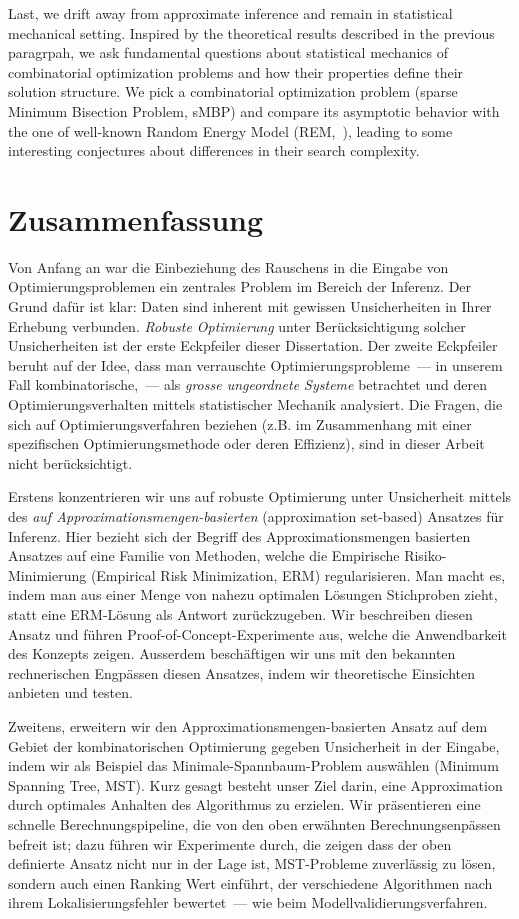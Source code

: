 Last, we drift away from approximate inference and remain in statistical
mechanical setting. Inspired by the theoretical results described in the
previous paragrpah, we ask fundamental questions about statistical mechanics of
combinatorial optimization problems and how their properties define their
solution structure. We pick a combinatorial optimization problem (sparse Minimum
Bisection Problem, sMBP) and compare its asymptotic behavior with the one of
well-known Random Energy Model (REM,~\citealp{derrida81}), leading to some
interesting conjectures about differences in their search complexity.

\chapter*{Zusammenfassung}

Von Anfang an war die Einbeziehung des Rauschens in die Eingabe von
Optimierungsproblemen ein zentrales Problem im Bereich der Inferenz. Der Grund
dafür ist klar: Daten sind inherent mit gewissen Unsicherheiten in Ihrer
Erhebung verbunden. \textit{Robuste Optimierung} unter Berücksichtigung solcher Unsicherheiten
ist der erste Eckpfeiler dieser Dissertation. Der zweite Eckpfeiler beruht auf
der Idee, dass man verrauschte Optimierungsprobleme~--- in unserem Fall
kombinatorische,~--- als \textit{grosse ungeordnete Systeme} betrachtet und
deren Optimierungsverhalten mittels statistischer Mechanik analysiert. Die
Fragen, die sich auf Optimierungsverfahren beziehen (z.B. im Zusammenhang mit
einer spezifischen Optimierungsmethode oder deren Effizienz), sind in dieser Arbeit
nicht berücksichtigt.


Erstens konzentrieren wir uns auf robuste Optimierung unter Unsicherheit mittels
des \textit{auf Approximationsmengen-basierten} (approximation set-based)
Ansatzes für Inferenz. Hier bezieht sich der Begriff des Approximationsmengen
basierten Ansatzes auf eine Familie von Methoden, welche die Empirische
Risiko-Minimierung (Empirical Risk Minimization, ERM) regularisieren. Man macht
es, indem man aus einer Menge von nahezu optimalen Lösungen Stichproben zieht,
statt eine ERM-Lösung als Antwort zurückzugeben. Wir beschreiben diesen Ansatz
und führen Proof-of-Concept-Experimente aus, welche die Anwendbarkeit des
Konzepts zeigen. Ausserdem beschäftigen wir uns mit den bekannten rechnerischen
Engpässen diesen Ansatzes, indem wir theoretische Einsichten anbieten und
testen.

Zweitens, erweitern wir den Approximationsmengen-basierten Ansatz auf dem Gebiet
der kombinatorischen Optimierung gegeben Unsicherheit in der Eingabe, indem wir
als Beispiel das Minimale-Spannbaum-Problem auswählen (Minimum Spanning Tree,
MST). Kurz gesagt besteht unser Ziel darin, eine Approximation durch optimales
Anhalten des Algorithmus zu erzielen. Wir präsentieren eine schnelle
Berechnungspipeline, die von den oben erwähnten Berechnungsenpässen befreit ist;
dazu führen wir Experimente durch, die zeigen dass der oben definierte Ansatz
nicht nur in der Lage ist, MST-Probleme zuverlässig zu lösen, sondern auch einen
Ranking Wert einführt, der verschiedene Algorithmen nach ihrem
Lokalisierungsfehler bewertet~--- wie beim Modellvalidierungsverfahren.

